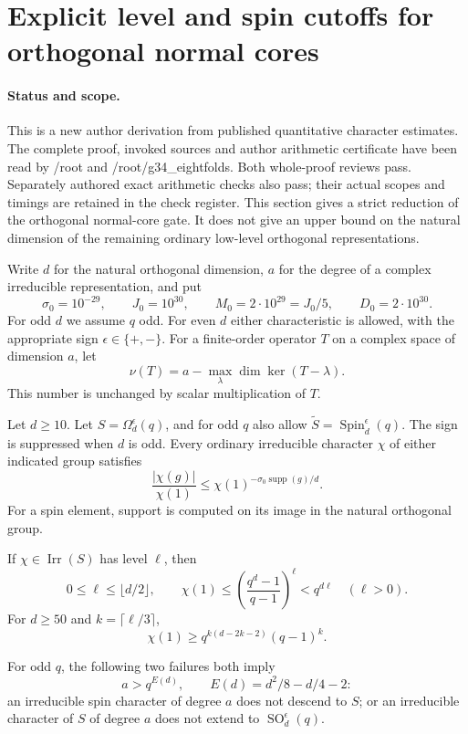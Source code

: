 \section{Explicit level and spin cutoffs for orthogonal normal cores}
\label{sec:orthogonal-level-cutoff}

\paragraph{Status and scope.}
This is a new author derivation from published quantitative character
estimates. The complete proof, invoked sources and author arithmetic certificate
have been read by /root and /root/g34\_eightfolds. Both whole-proof
reviews pass. Separately authored exact arithmetic checks also pass;
their actual scopes and timings are retained in the check register.
This section gives a strict reduction of the orthogonal normal-core
gate. It does not give an upper bound on the natural dimension of
the remaining ordinary low-level orthogonal representations.

Write $d$ for the natural orthogonal dimension, $a$ for the degree
of a complex irreducible representation, and put
\[
 \sigma_0=10^{-29},\qquad J_0=10^{30},\qquad
 M_0=2\cdot10^{29}=J_0/5,\qquad D_0=2\cdot10^{30}.
                                                               \tag{OL.1}
\]
For odd $d$ we assume $q$ odd. For even $d$ either characteristic
is allowed, with the appropriate sign $\epsilon\in\{+,-\}$.
For a finite-order operator $T$ on a complex space of dimension $a$,
let
\[
                 \nu(T)=a-\max_\lambda\dim\ker(T-\lambda).
                                                               \tag{OL.2}
\]
This number is unchanged by scalar multiplication of $T$.

\begin{lemma}
\label{D-OL-01}
Let $d\ge10$. Let $S=\Omega_d^\epsilon(q)$, and for odd $q$
also allow $\widetilde S=\operatorname{Spin}_d^\epsilon(q)$.
The sign is suppressed when $d$ is odd. Every ordinary
irreducible character $\chi$ of either indicated group satisfies
\[
 \frac{|\chi(g)|}{\chi(1)}
 \le \chi(1)^{-\sigma_0\operatorname{supp}(g)/d}.
                                                               \tag{OL.3}
\]
For a spin element, support is computed on its image in the
natural orthogonal group.

If $\chi\in\operatorname{Irr}(S)$ has level $\ell$, then
\[
 0\le\ell\le\lfloor d/2\rfloor,\qquad
 \chi(1)\le\left(\frac{q^d-1}{q-1}\right)^\ell<q^{d\ell}
 \quad(\ell>0).
                                                               \tag{OL.4}
\]
For $d\ge50$ and $k=\lceil\ell/3\rceil$,
\[
              \chi(1)\ge q^{k(d-2k-2)}(q-1)^k.
                                                               \tag{OL.5}
\]

For odd $q$, the following two failures both imply
\[
                 a>q^{E(d)},\qquad
                 E(d)=d^2/8-d/4-2:
                                                               \tag{OL.6}
\]
an irreducible spin character of degree $a$ does not descend to
$S$; or an irreducible character of $S$ of degree $a$ does not
extend to $\operatorname{SO}_d^\epsilon(q)$.
\end{lemma}

